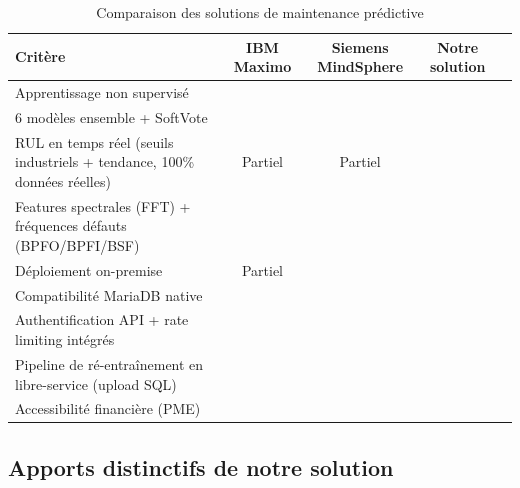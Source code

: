 \documentclass[12pt,a4paper]{report}
\newcommand{\cmark}{\ding{51}}
\newcommand{\xmark}{\ding{55}}
\begin{document}
\begin{table}[H]
\centering
\caption{Comparaison des solutions de maintenance prédictive}
\label{tab:comparaison}
\begin{tabularx}{\textwidth}{Xcccc}
\toprule
\textbf{Critère} & \textbf{IBM Maximo} & \textbf{Siemens MindSphere} & \textbf{Notre solution} \\
\midrule
Apprentissage non supervisé      & \xmark & \xmark & \cmark \\
6 modèles ensemble + SoftVote     & \xmark & \xmark & \cmark \\
RUL en temps réel (seuils industriels + tendance, 100\% données réelles) & Partiel & Partiel & \cmark \\
Features spectrales (FFT) + fréquences défauts (BPFO/BPFI/BSF) & \cmark & \cmark & \cmark \\
Déploiement on-premise            & Partiel & \xmark & \cmark \\
Compatibilité MariaDB native      & \xmark & \xmark & \cmark \\
Authentification API + rate limiting intégrés & \cmark & \cmark & \cmark \\
Pipeline de ré-entraînement en libre-service (upload SQL) & \xmark & \xmark & \cmark \\
Accessibilité financière (PME)    & \xmark & \xmark & \cmark \\
\bottomrule
\end{tabularx}
\end{table}

\subsection{Apports distinctifs de notre solution}
\end{document}

